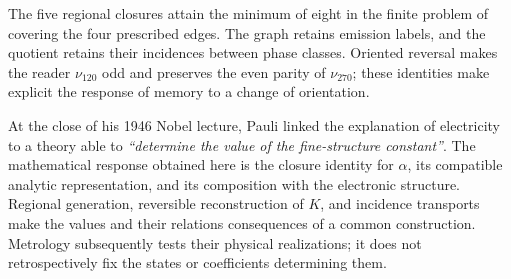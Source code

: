 The five regional closures attain the minimum of eight in the finite
problem of covering the four prescribed edges. The graph retains
emission labels, and the quotient retains their incidences between
phase classes. Oriented reversal makes the reader \(\nu_{120}\) odd
and preserves the even parity of \(\nu_{270}\); these identities
make explicit the response of memory to a change of orientation.
\par %




At the close of his 1946 Nobel lecture, Pauli linked the explanation of electricity to a theory able to \emph{“determine the value of the fine-structure constant”}\cite{pauli1946}. The mathematical response obtained here is the closure identity for \(\alpha\), its compatible analytic representation, and its composition with the electronic structure. Regional generation, reversible reconstruction of \(K\), and incidence transports make the values and their relations consequences of a common construction. Metrology subsequently tests their physical realizations; it does not retrospectively fix the states or coefficients determining them.
